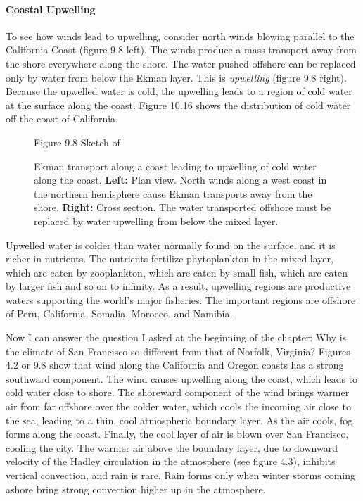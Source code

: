 \paragraph{Coastal Upwelling}
To see how winds lead to
upwelling, consider north winds blowing parallel to the California
Coast (figure 9.8 left). The winds produce a mass transport away
from the shore everywhere along the shore. The water pushed offshore can be replaced only by
water from below the Ekman layer. This is
\textit{upwelling} (figure 9.8 right). Because the upwelled
water is cold, the upwelling leads to a region of cold water at the surface along the
coast. Figure 10.16 shows the distribution of cold water off the coast of California.
\begin{figure}[t!]
\footnotesize
Figure 9.8 Sketch of \rule{0mm}{5ex}Ekman transport along a coast
leading to upwelling of cold water along the coast. \textbf{Left:} Plan view. North winds along a west coast in the northern hemisphere cause Ekman transports away from the shore. \textbf{Right:} Cross section. The water transported offshore must be replaced by water upwelling from below the mixed layer. 
\label{fig:upwelling}
\vspace{-3ex}
\end{figure}

Upwelled water is colder than water normally found on the surface, and it is
richer in nutrients. The nutrients fertilize phytoplankton in the mixed layer, which are eaten by zooplankton, which are eaten by small fish, which
are eaten by larger fish and so on to infinity. As a result, upwelling regions are productive waters supporting the world's major fisheries. The important
regions are offshore of Peru, California, Somalia, Morocco, and Namibia.

Now I can answer the question I asked at the beginning of the chapter: Why is
the climate of San Francisco so different from that of Norfolk, Virginia?
Figures 4.2 or 9.8 show that wind along the California and Oregon coasts has a
strong southward component. The wind causes upwelling along the coast,
which leads to cold water close to shore. The shoreward component of the wind brings
warmer air from far offshore over the colder water, which cools the incoming air
close to the sea, leading to a thin, cool atmospheric boundary layer. As the air
cools, fog forms along the coast. Finally, the cool layer of air is blown over
San Francisco, cooling the city. The warmer air above the boundary layer, due to
downward velocity of the Hadley circulation in the atmosphere (see figure 4.3),
inhibits vertical convection, and rain is rare. Rain forms only when winter
storms coming ashore bring strong convection higher up in the atmosphere.


